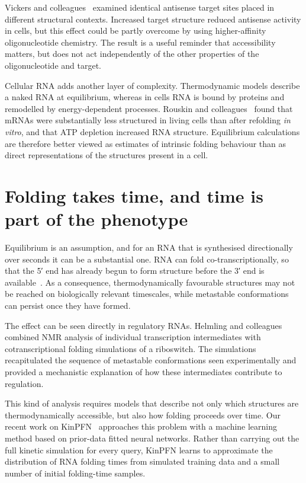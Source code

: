 Vickers and colleagues~\cite{vickers2000} examined identical antisense target
sites placed in different structural contexts. Increased target structure
reduced antisense activity in cells, but this effect could be partly overcome
by using higher-affinity oligonucleotide chemistry. The result is a useful
reminder that accessibility matters, but does not act independently of the
other properties of the oligonucleotide and target.

Cellular RNA adds another layer of complexity. Thermodynamic models describe
a naked RNA at equilibrium, whereas in cells RNA is bound by proteins and
remodelled by energy-dependent processes. Rouskin and colleagues~\cite{rouskin2014}
found that mRNAs were substantially less structured in living cells than
after refolding \emph{in vitro}, and that ATP depletion increased RNA
structure. Equilibrium calculations are therefore better viewed as estimates
of intrinsic folding behaviour than as direct representations of the structures
present in a cell.

\section{Folding takes time, and time is part of the phenotype}

Equilibrium is an assumption, and for an RNA that is synthesised
directionally over seconds it can be a substantial one. RNA can fold
co-transcriptionally, so that the 5′ end has already begun to form structure
before the 3′ end is available~\cite{watters2016}. As a consequence,
thermodynamically favourable structures may not be reached on biologically
relevant timescales, while metastable conformations can persist once they have
formed.

The effect can be seen directly in regulatory RNAs. Helmling and
colleagues~\cite{helmling2017} combined NMR analysis of individual
transcription intermediates with cotranscriptional folding simulations of a
riboswitch. The simulations recapitulated the sequence of metastable
conformations seen experimentally and provided a mechanistic explanation
of how these intermediates contribute to regulation.

This kind of analysis requires models that describe not only which structures
are thermodynamically accessible, but also how folding proceeds over time.
Our recent work on KinPFN~\cite{scheuer2025} approaches this problem with a
machine learning method based on prior-data fitted neural networks. Rather
than carrying out the full kinetic simulation for every query, KinPFN learns
to approximate the distribution of RNA folding times from simulated training
data and a small number of initial folding-time samples.

